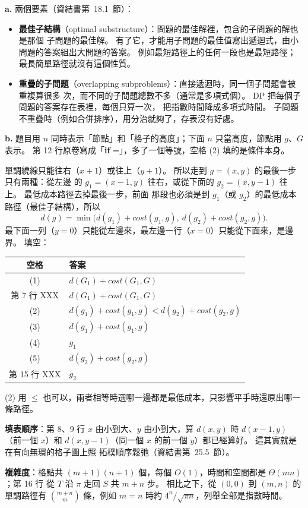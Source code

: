 \begin{pastsoln}
\textbf{a.} 兩個要素（資結書第~18.1~節）：
\begin{itemize}
\item \textbf{最佳子結構}（optimal substructure）：問題的最佳解裡，包含的子問題的解也是那個
子問題的最佳解。 有了它，才能用子問題的最佳值寫出遞迴式，由小問題的答案組出大問題的答案。
例如最短路徑上的任何一段也是最短路徑；最長簡單路徑就沒有這個性質。
\item \textbf{重疊的子問題}（overlapping subproblems）：直接遞迴時，同一個子問題會被重複算很多
次，而不同的子問題總數不多（通常是多項式個）。 DP 把每個子問題的答案存在表裡，每個只算一次，
把指數時間降成多項式時間。 子問題不重疊時（例如合併排序），用分治就夠了，存表沒有好處。
\end{itemize}

\textbf{b.} 題目用 $n$ 同時表示「節點」和「格子的高度」；下面 $n$ 只當高度，節點用 $g$、$G$
表示。 第 12 行原卷寫成「\textbf{if} =」，多了一個等號，空格 (2) 填的是條件本身。

單調繞線只能往右（$x + 1$）或往上（$y + 1$）。 所以走到 $g = (x, y)$ 的最後一步只有兩種：從左邊
的 $g_1 = (x - 1, y)$ 往右，或從下面的 $g_2 = (x, y - 1)$ 往上。 最低成本路徑去掉最後一步，前面
那段也必須是到 $g_1$（或 $g_2$）的最低成本路徑（最佳子結構），所以
\[
d(g) = \min\bigl( d(g_1) + \mathit{cost}(g_1, g),\ d(g_2) + \mathit{cost}(g_2, g) \bigr).
\]
最下面一列（$y = 0$）只能從左邊來，最左邊一行（$x = 0$）只能從下面來，是邊界。 填空：
\begin{center}
\begin{tabular}{cl}
\toprule
空格 & 答案 \\
\midrule
(1) & $d(G_1) + \mathit{cost}(G_1, G)$ \\
第 7 行 XXX & $d(G_1) + \mathit{cost}(G_1, G)$ \\
(2) & $d(g_1) + \mathit{cost}(g_1, g) < d(g_2) + \mathit{cost}(g_2, g)$ \\
(3) & $d(g_1) + \mathit{cost}(g_1, g)$ \\
(4) & $g_1$ \\
(5) & $d(g_2) + \mathit{cost}(g_2, g)$ \\
第 15 行 XXX & $g_2$ \\
\bottomrule
\end{tabular}
\end{center}
(2) 用 $\le$ 也可以，兩者相等時選哪一邊都是最低成本，只影響平手時還原出哪一條路徑。

\textbf{填表順序}：第 8、9 行 $x$ 由小到大、$y$ 由小到大，算 $d(x, y)$ 時 $d(x - 1, y)$（前一個
$x$）和 $d(x, y - 1)$（同一個 $x$ 的前一個 $y$）都已經算好。 這其實就是在有向無環的格子圖上照
拓樸順序鬆弛（資結書第~25.5~節）。

\textbf{複雜度}：格點共 $(m + 1)(n + 1)$ 個，每個 $O(1)$，時間和空間都是 $\Theta(mn)$；第 16 行
從 $T$ 沿 $\pi$ 走回 $S$ 共 $m + n$ 步。 相比之下，從 $(0, 0)$ 到 $(m, n)$ 的單調路徑有
$\binom{m+n}{m}$ 條，例如 $m = n$ 時約 $4^n/\sqrt{\pi n}$，列舉全部是指數時間。
\end{pastsoln}
